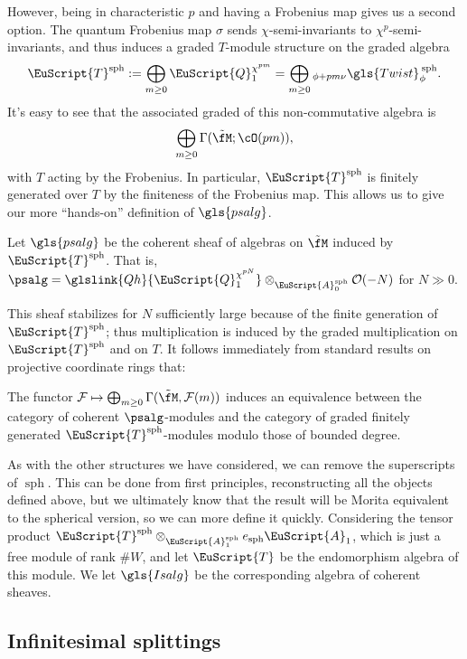However, being in characteristic $p$ and having a Frobenius map gives us a second option.  The quantum Frobenius map $\sigma$ sends $\chi$-semi-invariants to $\chi^p$-semi-invariants, and thus induces a graded $T$-module structure on the graded algebra \[\EuScript{T}^{\operatorname{sph}}:=\bigoplus_{m\geq 0}\EuScript{Q}_1^{\chi^{pm}}=\bigoplus_{m\geq 0}{}_{\phi+pm\nu}\gls{Twist}^{\:\operatorname{sph}}_\phi.\]
It's easy to see that the associated graded of this non-commutative algebra is \[\bigoplus_{m\geq 0}\Gamma(\tilde{\fM};\cO(pm)),\] with $T$ acting by the Frobenius. In particular, $\EuScript{T}^{\operatorname{sph}}$ is finitely generated over $T$ by the finiteness of the Frobenius map.
This allows us to give our more ``hands-on'' definition of $\gls{psalg}$.
\begin{definition}
 Let $\gls{psalg}$ be the coherent sheaf of algebras on $\tilde{\fM}$ induced by $\EuScript{T}^{\operatorname{sph}}$.  That is, $\psalg=\glslink{Qh}{\EuScript{Q}_1^{\chi^{pN}}}\otimes_{\EuScript{A}_0^{\operatorname{sph}}}\mathcal{O}(-N)$ for $N\gg 0$.  
\end{definition}
This sheaf stabilizes for $N$ sufficiently large because of the finite generation of $\EuScript{T}^{\operatorname{sph}}$; thus multiplication is induced by the graded multiplication on $\EuScript{T}^{\operatorname{sph}}$ and on $T$.   It follows immediately from standard results on projective coordinate rings that:
\begin{corollary}
  The functor $\mathcal{F}\mapsto \bigoplus_{m\geq 0}\Gamma(\tilde{\fM},\mathcal{F}(m))$ induces an equivalence between the category of coherent $\psalg$-modules and the category of graded finitely generated $\EuScript{T}^{\operatorname{sph}}$-modules modulo those of bounded degree.
\end{corollary}
As with the other structures we have considered, we can remove the superscripts of $\operatorname{sph}$.  This can be done from first principles, reconstructing all the objects defined above, but we ultimately know that the result will be Morita equivalent to the spherical version, so we can more define it quickly.  Considering the tensor product $\EuScript{T}^{\operatorname{sph}}\otimes_{\EuScript{A}_1^{\operatorname{sph}}}e_{\operatorname{sph}}\EuScript{A}_1$, which is just a free module of rank $\#W$, and let $\EuScript{T}$ be the endomorphism algebra of this module.  We let $\gls{Isalg}$ be the corresponding algebra of coherent sheaves.  



\subsection{Infinitesimal splittings}

